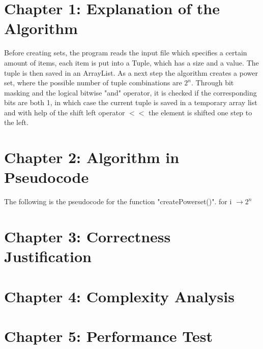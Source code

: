 \documentclass{article}
\begin{document}
\section*{Chapter 1:  Explanation of the Algorithm} 
 \noindent Before creating sets, the program reads the input file which specifies a certain amount of items, each item is put into a Tuple, which has a size and a value. 
 The tuple is then saved in an ArrayList. As a next step the algorithm creates a power set, where the possible number of tuple combinations are $2^n$. Through bit masking
 and the logical bitwise "and" operator, it is checked if the corresponding bits are both 1, in which case the current tuple is saved in a temporary array list and with help of the 
 shift left operator $<<$ the element is shifted one step to the left. 

\section*{Chapter 2: Algorithm in Pseudocode}
\noindent The following is the pseudocode for the function "createPowerset()". \newline
for i $\rightarrow 2^n$

\section*{Chapter 3: Correctness Justification}

\section*{Chapter 4: Complexity Analysis}

\section*{Chapter 5: Performance Test}
\end{document}
